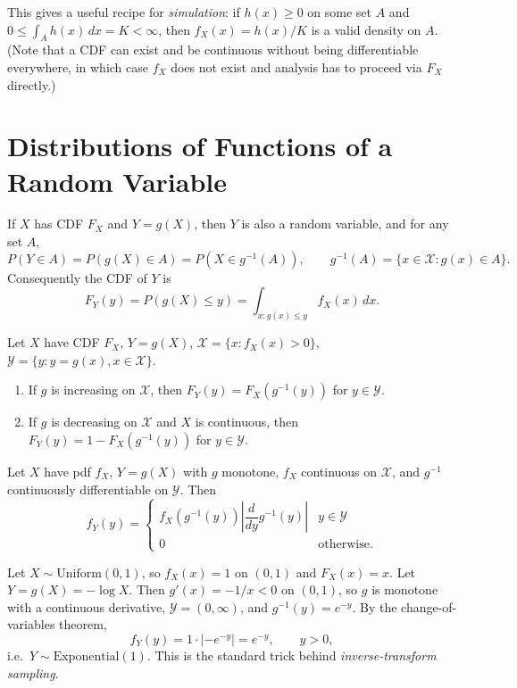 \documentclass[11pt]{article}
\begin{document}
This gives a useful recipe for \emph{simulation}: if $h(x) \ge 0$ on some set
$A$ and $0 \le \int_A h(x)\,dx = K < \infty$, then $f_X(x) = h(x)/K$ is a
valid density on $A$. (Note that a CDF can exist and be continuous without
being differentiable everywhere, in which case $f_X$ does not exist and
analysis has to proceed via $F_X$ directly.)

\section{Distributions of Functions of a Random Variable}

If $X$ has CDF $F_X$ and $Y = g(X)$, then $Y$ is also a random variable, and
for any set $A$,
\[
  P(Y \in A) = P(g(X) \in A) = P(X \in g^{-1}(A)),
  \qquad g^{-1}(A) = \{x \in \mathcal{X} : g(x) \in A\}.
\]
Consequently the CDF of $Y$ is
\[
  F_Y(y) = P(g(X) \le y) = \int_{x : g(x) \le y} f_X(x)\, dx.
\]

\begin{theorem}
Let $X$ have CDF $F_X$, $Y = g(X)$, $\mathcal{X} = \{x : f_X(x) > 0\}$,
$\mathcal{Y} = \{y : y = g(x), x \in \mathcal{X}\}$.
\begin{enumerate}
  \item If $g$ is increasing on $\mathcal{X}$, then
        $F_Y(y) = F_X(g^{-1}(y))$ for $y \in \mathcal{Y}$.
  \item If $g$ is decreasing on $\mathcal{X}$ and $X$ is continuous, then
        $F_Y(y) = 1 - F_X(g^{-1}(y))$ for $y \in \mathcal{Y}$.
\end{enumerate}
\end{theorem}

\begin{theorem}
Let $X$ have pdf $f_X$, $Y = g(X)$ with $g$ monotone, $f_X$ continuous on
$\mathcal{X}$, and $g^{-1}$ continuously differentiable on $\mathcal{Y}$.
Then
\[
  f_Y(y) =
  \begin{cases}
    f_X(g^{-1}(y)) \left| \dfrac{d}{dy} g^{-1}(y) \right| & y \in \mathcal{Y} \\
    0 & \text{otherwise.}
  \end{cases}
\]
\end{theorem}

\begin{example}
Let $X \sim \mathrm{Uniform}(0,1)$, so $f_X(x) = 1$ on $(0,1)$ and
$F_X(x) = x$. Let $Y = g(X) = -\log X$. Then $g'(x) = -1/x < 0$ on $(0,1)$,
so $g$ is monotone with a continuous derivative, $\mathcal{Y} = (0,\infty)$,
and $g^{-1}(y) = e^{-y}$. By the change-of-variables theorem,
\[
  f_Y(y) = 1 \cdot |{-e^{-y}}| = e^{-y}, \qquad y > 0,
\]
i.e.\ $Y \sim \mathrm{Exponential}(1)$. This is the standard trick behind
\emph{inverse-transform sampling}.
\end{example}
\end{document}
